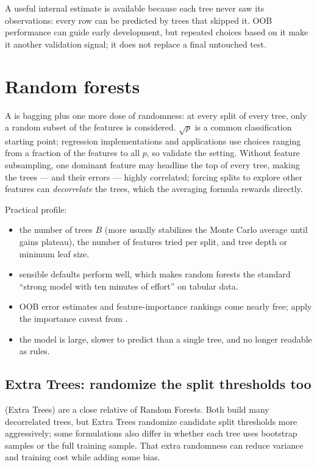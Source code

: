 A useful internal estimate is available because each tree never saw its  observations: every row can be predicted by trees that skipped it. OOB performance can guide early development, but repeated choices based on it make it another validation signal; it does not replace a final untouched test.

\section{Random forests}
\label{sec:random-forest}

A  is bagging plus one more dose of randomness: at every split of every tree, only a random subset of the features is considered. $\sqrt{p}$ is a common classification starting point; regression implementations and applications use choices ranging from a fraction of the features to all $p$, so validate the setting. Without feature subsampling, one dominant feature may headline the top of every tree, making the trees --- and their errors --- highly correlated; forcing splits to explore other features can \emph{decorrelate} the trees, which the averaging formula rewards directly.

Practical profile:

\begin{itemize}
  \item {} the number of trees $B$ (more usually stabilizes the Monte Carlo average until gains plateau), the number of features tried per split, and tree depth or minimum leaf size.
  \item {} sensible defaults perform well, which makes random forests the standard ``strong model with ten minutes of effort'' on tabular data.
  \item {} OOB error estimates and feature-importance rankings come nearly free; apply the importance caveat from .
  \item {} the model is large, slower to predict than a single tree, and no longer readable as rules.
\end{itemize}

\subsection{Extra Trees: randomize the split thresholds too}
\label{sec:extra-trees}

 (Extra Trees) are a close relative of Random Forests. Both build many decorrelated trees, but Extra Trees randomize candidate split thresholds more aggressively; some formulations also differ in whether each tree uses bootstrap samples or the full training sample. That extra randomness can reduce variance and training cost while adding some bias.

